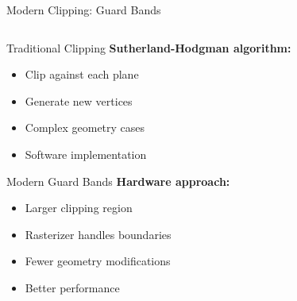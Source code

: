 \begin{frame}{Modern Clipping: Guard Bands}
  \begin{columns}
    \begin{column}{0.5\textwidth}
      \begin{conceptbox}{Traditional Clipping}
        \textbf{Sutherland-Hodgman algorithm:}
        \begin{itemize}
          \item Clip against each plane
          \item Generate new vertices
          \item Complex geometry cases
          \item Software implementation
        \end{itemize}
      \end{conceptbox}

      \vspace{0.3cm}

      \begin{raybox}{Modern Guard Bands}
        \textbf{Hardware approach:}
        \begin{itemize}
          \item Larger clipping region
          \item Rasterizer handles boundaries
          \item Fewer geometry modifications
          \item Better performance
        \end{itemize}
      \end{raybox}
    \end{column}
    \begin{column}{0.5\textwidth}
\end{column}
\end{columns}
\end{frame}
